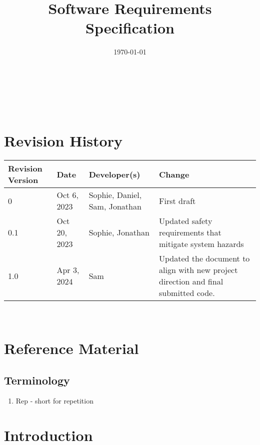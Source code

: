 \documentclass[12pt]{article}
\begin{document}
\title{Software Requirements Specification\\ \progname} 
\author{\authname}
\date{\today}
	
\maketitle

~\newpage


\tableofcontents

~\newpage

\section*{Revision History}

\begin{table}[hp]
		\centering
		\begin{tabularx}{\textwidth}{lllX}
			\toprule
			\textbf{Revision Version} & \textbf{Date} & \textbf{Developer(s)} & \textbf{Change}\\
			\midrule
			0 & Oct 6, 2023 & Sophie, Daniel, Sam, Jonathan & First draft\\
            \hline
            0.1 & Oct 20, 2023 & Sophie, Jonathan & Updated safety requirements that mitigate system hazards\\
            \hline
            1.0 & Apr 3, 2024 & Sam & Updated the document to align with new project direction and final submitted code.\\
			\bottomrule
		\end{tabularx}
	\end{table}


~\newpage


\section{Reference Material}

\subsection{Terminology}
\begin{enumerate}
    \item Rep - short for repetition 
\end{enumerate}


\section{Introduction}
\end{document}
